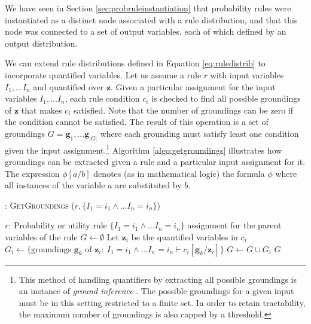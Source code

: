 We have seen in Section \ref{sec:probruleinstantiation} that probability rules were instantiated as a distinct node associated with a rule distribution, and that this node was connected to a set of output variables, each of which defined by an output distribution.  

 We can extend rule distributions defined in Equation \eqref{eq:ruledistrib} to incorporate quantified variables.  Let us assume a rule $r$ with input variables $I_1,...I_n$ and quantified over $\mathbf{z}$.  Given a particular assignment for the input variables $I_1,...I_n$, each rule condition $c_i$ is checked to find all possible groundings of $\mathbf{z}$  that makes $c_i$ satisfied.  Note that the number of groundings can be zero if the condition cannot be satisfied. The result of this operation is a set of groundings $G= \mathbf{g}_1,...\mathbf{g}_{|G|}$ where each grounding must satisfy least one condition given the input assignment.\footnote{This method of handling quantifiers by extracting all possible groundings is an instance of \textit{ground inference} \citep{getoor:srlbook07}. The possible groundings for a given input must be in this setting restricted to a finite set. In order to retain tractability, the maximum number of groundings is also capped by a threshold.} Algorithm \ref{algo:getgroundings} illustrates how groundings can be extracted given a rule and a particular input assignment for it. The expression $\phi[a/b]$ denotes (as in mathematical logic) the formula $\phi$ where all instances of the variable $a$ are substituted by $b$.
 
 
\begin{algorithm}[h!]
\caption{: \textsc{GetGroundings} ($r, \{I_1\!=\!i_1 \land ... I_n\!=\!i_n\}$)}
\begin{algorithmic}[1] \vspace{1mm}
\REQUIRE $r$: Probability or utility rule 
\REQUIRE $\{I_1\!=\!i_1 \land ... I_n\!=\!i_n\}$ assignment for the parent variables of the rule  \vspace{1mm}
\STATE $G \leftarrow \emptyset$
\STATE Let $\mathbf{z}_i$ be the quantified variables in $c_i$
\STATE $G_i \leftarrow \{\text{groundings } \mathbf{g}_k \text{ of } \mathbf{z}_i: \ I_1\!=\!i_1 \land ... I_n\!=\!i_n \vdash c_i [\mathbf{g}_k / \mathbf{z}_i ]\}$
\STATE $G \leftarrow G \cup G_i$
\ENDFOR
\RETURN $G$
\end{algorithmic}
\label{algo:getgroundings}
\end{algorithm}
 
